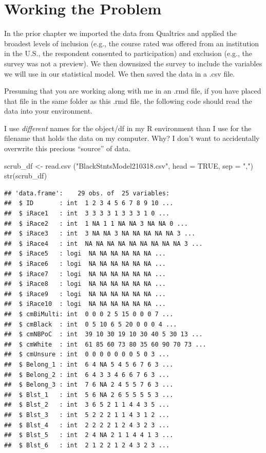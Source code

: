\documentclass[
  english,
]{book}
\newenvironment{Shaded}{\begin{snugshade}}{\end{snugshade}}
\newcommand{\AttributeTok}[1]{\textcolor[rgb]{0.77,0.63,0.00}{#1}}
\newcommand{\ConstantTok}[1]{\textcolor[rgb]{0.00,0.00,0.00}{#1}}
\newcommand{\FunctionTok}[1]{\textcolor[rgb]{0.00,0.00,0.00}{#1}}
\newcommand{\NormalTok}[1]{#1}
\newcommand{\OtherTok}[1]{\textcolor[rgb]{0.56,0.35,0.01}{#1}}
\newcommand{\StringTok}[1]{\textcolor[rgb]{0.31,0.60,0.02}{#1}}
\begin{document}
\hypertarget{working-the-problem-1}{%
\section{Working the Problem}\label{working-the-problem-1}}

In the prior chapter we imported the data from Qualtrics and applied the broadest levels of inclusion (e.g., the course rated was offered from an institution in the U.S., the respondent consented to participation) and exclusion (e.g., the survey was not a preview). We then downsized the survey to include the variables we will use in our statistical model. We then saved the data in a .csv file.

Presuming that you are working along with me in an .rmd file, if you have placed that file in the same folder as this .rmd file, the following code should read the data into your environment.

I use \emph{different} names for the object/df in my R environment than I use for the filename that holds the data on my computer. Why? I don't want to accidentally overwrite this precious ``source'' of data.

\begin{Shaded}
\begin{Highlighting}[]
\NormalTok{scrub\_df }\OtherTok{\textless{}{-}} \FunctionTok{read.csv}\NormalTok{ (}\StringTok{"BlackStntsModel210318.csv"}\NormalTok{, }\AttributeTok{head =} \ConstantTok{TRUE}\NormalTok{, }\AttributeTok{sep =} \StringTok{","}\NormalTok{)}
\FunctionTok{str}\NormalTok{(scrub\_df)}
\end{Highlighting}
\end{Shaded}

\begin{verbatim}
## 'data.frame':    29 obs. of  25 variables:
##  $ ID       : int  1 2 3 4 5 6 7 8 9 10 ...
##  $ iRace1   : int  3 3 3 3 1 3 3 3 1 0 ...
##  $ iRace2   : int  1 NA 1 1 NA NA 3 NA NA 0 ...
##  $ iRace3   : int  3 NA NA 3 NA NA NA NA NA 3 ...
##  $ iRace4   : int  NA NA NA NA NA NA NA NA NA 3 ...
##  $ iRace5   : logi  NA NA NA NA NA NA ...
##  $ iRace6   : logi  NA NA NA NA NA NA ...
##  $ iRace7   : logi  NA NA NA NA NA NA ...
##  $ iRace8   : logi  NA NA NA NA NA NA ...
##  $ iRace9   : logi  NA NA NA NA NA NA ...
##  $ iRace10  : logi  NA NA NA NA NA NA ...
##  $ cmBiMulti: int  0 0 0 2 5 15 0 0 0 7 ...
##  $ cmBlack  : int  0 5 10 6 5 20 0 0 0 4 ...
##  $ cmNBPoC  : int  39 10 30 19 10 30 40 5 30 13 ...
##  $ cmWhite  : int  61 85 60 73 80 35 60 90 70 73 ...
##  $ cmUnsure : int  0 0 0 0 0 0 0 5 0 3 ...
##  $ Belong_1 : int  6 4 NA 5 4 5 6 7 6 3 ...
##  $ Belong_2 : int  6 4 3 3 4 6 6 7 6 3 ...
##  $ Belong_3 : int  7 6 NA 2 4 5 5 7 6 3 ...
##  $ Blst_1   : int  5 6 NA 2 6 5 5 5 5 3 ...
##  $ Blst_2   : int  3 6 5 2 1 1 4 4 3 5 ...
##  $ Blst_3   : int  5 2 2 2 1 1 4 3 1 2 ...
##  $ Blst_4   : int  2 2 2 2 1 2 4 3 2 3 ...
##  $ Blst_5   : int  2 4 NA 2 1 1 4 4 1 3 ...
##  $ Blst_6   : int  2 1 2 2 1 2 4 3 2 3 ...
\end{verbatim}
\end{document}
